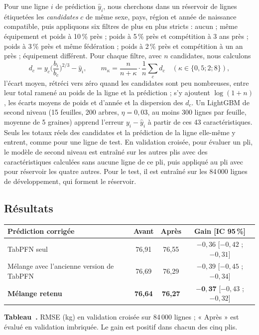 \documentclass[11pt,a4paper]{article}
\newenvironment{tableau}{\par\smallskip\noindent\begin{minipage}{\linewidth}\centering}{\end{minipage}\par\smallskip}
\newcounter{tab}
\newcommand{\legende}[2]{\refstepcounter{tab}\label{#1}{\small\textbf{Tableau~\thetab.} #2\par}}
\begin{document}
Pour une ligne $i$ de prédiction $\hat y_i$, nous cherchons dans un réservoir de lignes étiquetées les
\emph{candidates} $c$ de même sexe, pays, région et année de naissance compatible, puis appliquons six filtres
de plus en plus stricts : aucun ; même équipement et poids à 10\,\% près ; poids à 5\,\% près et compétition à
3 ans près ; poids à 3\,\% près et même fédération ; poids à 2\,\% près et compétition à un an près ; équipement
différent. Pour chaque filtre, avec $n$ candidates, nous calculons
\[
d_c = y_c \Big(\frac{b_i}{b_c}\Big)^{2/3} - \hat y_i, \qquad
m_\kappa = \frac{n}{n + \kappa}\cdot\frac1n \sum_c d_c \quad (\kappa \in \{0{,}5 ; 2 ; 8\}),
\]
l'écart moyen, rétréci vers zéro quand les candidates sont peu nombreuses, entre leur total ramené au poids de
la ligne et la prédiction ; s'y ajoutent $\log(1+n)$, les écarts moyens de poids et d'année et la dispersion des
$d_c$. Un LightGBM de second niveau (15 feuilles, 200 arbres, $\eta = 0{,}03$, au moins 300 lignes par feuille,
moyenne de 5 graines) apprend l'erreur $y_i - \hat y_i$ à partir de ces 43 caractéristiques. Seuls les totaux
réels des candidates et la prédiction de la ligne elle-même y entrent, comme pour une ligne de test. En
validation croisée, pour évaluer un pli, le modèle de second niveau est entraîné sur les autres plis avec des
caractéristiques calculées sans aucune ligne de ce pli, puis appliqué au pli avec pour réservoir les quatre
autres. Pour le test, il est entraîné sur les 84\,000 lignes de développement, qui forment le réservoir.

\subsection{Résultats}
\begin{tableau}\small
\begin{tabular}{@{}lccc@{}}
\toprule
Prédiction corrigée & Avant & Après & Gain [IC 95\,\%] \\
\midrule
TabPFN seul & 76,91 & 76,55 & $-0{,}36$ [$-0{,}42$ ; $-0{,}31$] \\
Mélange avec l'ancienne version de TabPFN & 76,69 & 76,29 & $-0{,}39$ [$-0{,}45$ ; $-0{,}34$] \\
\textbf{Mélange retenu} & \textbf{76,64} & \textbf{76,27} & $\mathbf{-0{,}37}$ [$-0{,}43$ ; $-0{,}32$] \\
\bottomrule
\end{tabular}\par\vspace{2pt}
\legende{tab:appariement}{RMSE (kg) en validation croisée sur 84\,000 lignes ; « Après » est évalué en validation
imbriquée. Le gain est positif dans chacun des cinq plis.}
\end{tableau}
\end{document}

